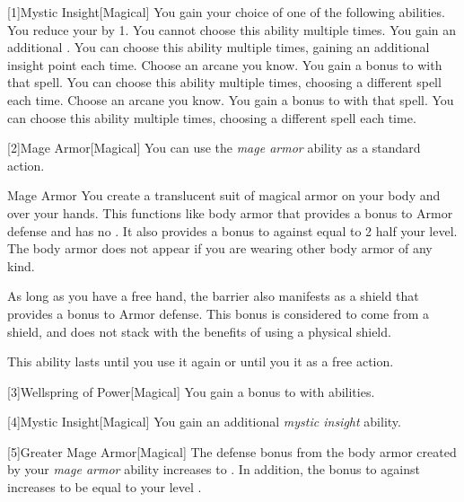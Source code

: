         [1]{Mystic Insight}[Magical]
        You gain your choice of one of the following abilities.
        {
             You reduce your  by 1.
                You cannot choose this ability multiple times.
             You gain an additional .
                You can choose this ability multiple times, gaining an additional insight point each time.
             Choose an arcane  you know.
                You gain a  bonus to  with that spell.
                You can choose this ability multiple times, choosing a different spell each time.
             Choose an arcane  you know.
                You gain a  bonus to  with that spell.
                You can choose this ability multiple times, choosing a different spell each time.
        }

        [2]{Mage Armor}[Magical] You can use the \textit{mage armor} ability as a standard action.
        \begin{freeability}{Mage Armor}
            You create a translucent suit of magical armor on your body and over your hands.
            This functions like body armor that provides a  bonus to Armor defense and has no .
            It also provides a bonus to  against  equal to 2 \add half your level.
            The body armor does not appear if you are wearing other body armor of any kind.

            As long as you have a free hand, the barrier also manifests as a shield that provides a  bonus to Armor defense.
            This bonus is considered to come from a shield, and does not stack with the benefits of using a physical shield.

            This ability lasts until you use it again or until you  it as a free action.
        \end{freeability}

        [3]{Wellspring of Power}[Magical]
        You gain a  bonus to  with  abilities.

        [4]{Mystic Insight}[Magical]
        You gain an additional \textit{mystic insight} ability.

        [5]{Greater Mage Armor}[Magical]
        The defense bonus from the body armor created by your \textit{mage armor} ability increases to .
        In addition, the bonus to  against  increases to be equal to your level .

